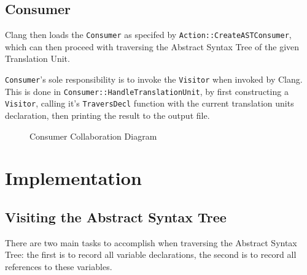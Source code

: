 \subsection{Consumer}
Clang then loads the \lstinline|Consumer| as specifed by
\lstinline|Action::CreateASTConsumer|, which can then proceed with traversing
the Abstract Syntax Tree of the given Translation Unit.

\lstinline|Consumer|'s sole responsibility is to invoke the \lstinline|Visitor|
when invoked by Clang. This is done in
\lstinline|Consumer::HandleTranslationUnit|, by first constructing a
\lstinline|Visitor|, calling it's \lstinline|TraversDecl| function with the
current translation units declaration, then printing the result to the output
file.

\begin{figure}[h]
	\label{fig:Consumer}
	\caption{Consumer Collaboration Diagram}
	\centering
\end{figure}

\section{Implementation}
\subsection{Visiting the Abstract Syntax Tree}

There are two main tasks to accomplish when traversing the Abstract Syntax Tree:
the first is to record all variable declarations, the second is to record all
references to these variables.

